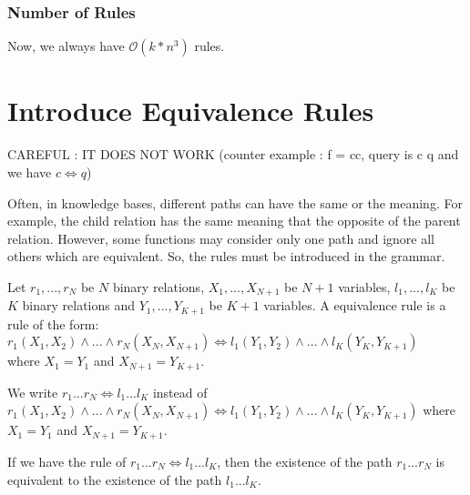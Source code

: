 \documentclass[10pt,a4paper,draft]{article}
\begin{document}
\subsubsection{Number of Rules}

Now, we always have $\mathcal{O}(k * n^3)$ rules.



\section{Introduce Equivalence Rules}

CAREFUL : IT DOES NOT WORK (counter example : f = cc, query is c q and we have $c \Leftrightarrow q$)

Often, in knowledge bases, different paths can have the same or the meaning. For example, the child relation has the same meaning that the opposite of the parent relation. However, some functions may consider only one path and ignore all others which are equivalent. So, the rules must be introduced in the grammar.

\begin{Definition}
Let $r_1,..., r_N$ be $N$ binary relations, $X_1,..., X_{N+1}$ be $N+1$ variables, $l_1,..., l_K$ be $K$ binary relations and $Y_1,..., Y_{K+1}$ be $K+1$ variables. A equivalence rule is a rule of the form: \\
$r_1(X_1, X_2) \wedge ... \wedge r_N(X_N, X_{N+1}) \Leftrightarrow l_1(Y_1, Y_2) \wedge ... \wedge l_K(Y_K, Y_{K+1})$ \\
where $X_1 = Y_1$ and $X_{N+1} = Y_{K+1}$.
\end{Definition}

\begin{Notation}
We write $r_1 ... r_N \Leftrightarrow l_1 ... l_K$ instead of $r_1(X_1, X_2) \wedge ... \wedge r_N(X_N, X_{N+1}) \Leftrightarrow l_1(Y_1, Y_2) \wedge ... \wedge l_K(Y_K, Y_{K+1})$ where $X_1 = Y_1$ and $X_{N+1} = Y_{K+1}$.
\end{Notation}

\begin{Hypothesis}
\label{ruleHypothesis}
If we have the rule of $r_1 ... r_N \Leftrightarrow l_1 ... l_K$, then the existence of the path $r_1 ... r_N$ is equivalent to the existence of the path $l_1 ... l_K$.
\end{Hypothesis}
\end{document}
